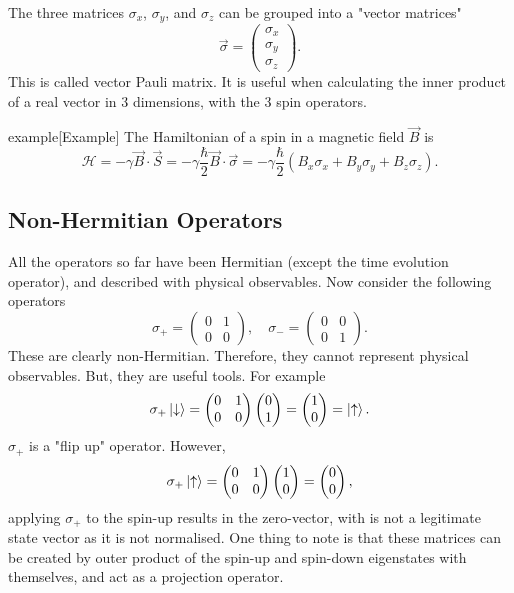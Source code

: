 \documentclass{article}
\begin{document}
The three matrices $\sigma _x$, $\sigma _y$, and $\sigma _z$ can be grouped into a "vector matrices"
\[
    \vec{\sigma }=\begin{pmatrix}
        \sigma _x \\ \sigma _y\\\sigma _z
    \end{pmatrix}.
\]
This is called vector Pauli matrix. It is useful when calculating the inner product of a real vector in 3 dimensions, with the 3 spin operators.

\begin{callout}{example}[Example]
\label{example:s3-e5}
The Hamiltonian of a spin in a magnetic field $\vec{B}$ is
\[
    \mathcal{H}=-\gamma \vec{B}\cdot\vec{S}=-\gamma \frac{\hbar}{2}\vec{B}\cdot \vec{\sigma }=-\gamma \frac{\hbar}{2}\left( B_x\sigma _x+B_y\sigma _y+B_z\sigma _z \right).
\]
\end{callout}

\subsection{Non-Hermitian Operators}
All the operators so far have been Hermitian (except the time evolution operator), and described with physical observables. Now consider the following operators
\[
    \sigma _+=\begin{pmatrix}
        0 & 1 \\ 0 & 0
    \end{pmatrix},\quad\sigma _-=\begin{pmatrix}
        0 & 0 \\ 0 &1
    \end{pmatrix}.
\]
These are clearly non-Hermitian. Therefore, they cannot represent physical observables. But, they are useful tools. For example
\[
    \sigma _+\ket{\downarrow}=\begin{pmatrix}
        0 & 1 \\ 0 & 0
    \end{pmatrix}\begin{pmatrix}
        0 \\ 1
    \end{pmatrix} =\begin{pmatrix}
        1 \\ 0
    \end{pmatrix}=\ket{\uparrow}.
\]
$\sigma _+$ is a "flip up" operator. However,
\[
    \sigma _+\ket{\uparrow}=\begin{pmatrix}
        0 & 1 \\ 0 & 0
    \end{pmatrix}\begin{pmatrix}
         1 \\ 0
    \end{pmatrix} =\begin{pmatrix}
        0 \\ 0
    \end{pmatrix},
\]
applying $\sigma _+$ to the spin-up results in the zero-vector, with is not a legitimate state vector as it is not normalised. One thing to note is that these matrices can be created by outer product of the spin-up and spin-down eigenstates with themselves, and act as a projection operator.
\end{document}
